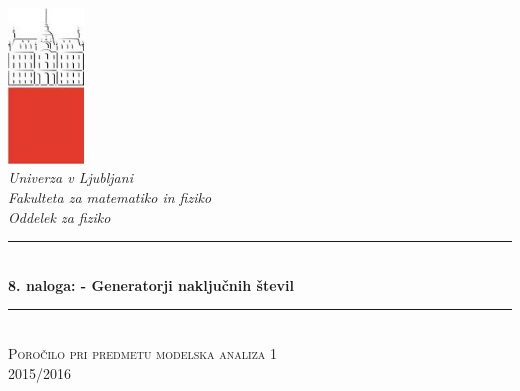 \documentclass[slovene,11pt,a4paper]{article}
\numberwithin{equation}{section} %
\numberwithin{figure}{section} %
\numberwithin{table}{section} %
\begin{document}
\begin{titlepage}

\newcommand{\HRule}{\rule{\linewidth}{0.5mm}} %

\center %


 

\includegraphics[width=2cm]{slike/aaa}\\[0.5cm]
 
\textit{Univerza v Ljubljani}\\
\textit{Fakulteta za {\color{red}matematiko in fiziko}}\\[0.5cm]

\emph{Oddelek za fiziko}\\[0.5cm] %


\HRule \\[0.4cm]
\huge {\bfseries 8. naloga: - Generatorji naključnih števil}\\[0.4cm] %
\HRule \\[0.5cm] 

 \textsc{\large Poročilo pri predmetu modelska analiza 1}\\
 \textsc{\large 2015/2016}\\[1cm] %
 

\end{titlepage}
\end{document}
